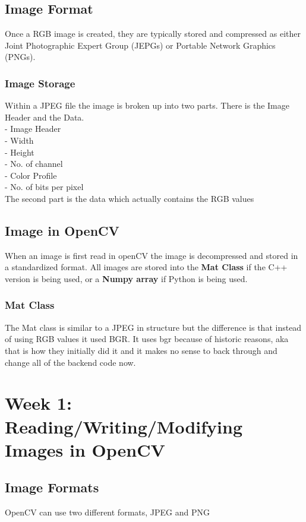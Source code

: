 \documentclass[fleqn]{article}
\begin{document}
    \subsection{Image Format}
    Once a RGB image is created, they are typically stored and compressed as either Joint Photographic Expert Group (JEPGs) or Portable Network Graphics (PNGs).

    \subsubsection{Image Storage}
    Within a JPEG file the image is broken up into two parts. There is the Image Header and the Data.\\
    \tab - Image Header\\
    \tab\tab - Width\\
    \tab\tab - Height\\
    \tab\tab - No. of channel\\
    \tab\tab - Color Profile\\
    \tab\tab - No. of bits per pixel\\
    The second part is the data which actually contains the RGB values

    \subsection{Image in OpenCV}
    When an image is first read in openCV the image is decompressed and stored in a standardized format. All images are stored into the \textbf{Mat Class} if the C++ version is being used, or a \textbf{Numpy array} if Python is being used.

    \subsubsection{Mat Class}
    The Mat class is similar to a JPEG in structure but the difference is that instead of using RGB values it used BGR. It uses bgr because of historic reasons, aka that is how they initially did it and it makes no sense to back through and change all of the backend code now.

    \newpage
    \clearpage
    \section{Week 1: Reading/Writing/Modifying Images in OpenCV}
    \subsection{Image Formats}
    OpenCV can use two different formats, JPEG and PNG
\end{document}
